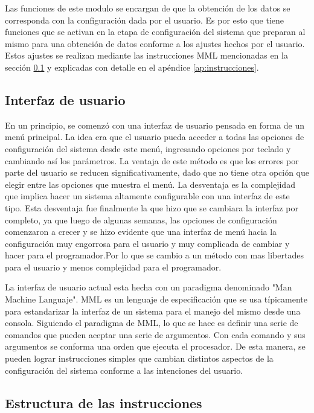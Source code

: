 Las funciones de este modulo se encargan de que la obtenci\'on de los datos se corresponda con la configuraci\'on dada por el usuario. Es por esto que tiene funciones que se activan en la etapa de configuraci\'on del sistema que preparan al mismo para una obtenci\'on de datos conforme a los ajustes hechos por el usuario. Estos ajustes se realizan mediante las instrucciones MML mencionadas en la secci\'on \ref{sub:interfaz_de_usuario} y explicadas con detalle en el ap\'endice \ref{ap:instrucciones}.


\subsection{Interfaz de usuario} %
\label{sub:interfaz_de_usuario}


En un principio, se comenz\'o con una interfaz de usuario pensada en forma de un men\'u principal. La idea era que el usuario pueda acceder a todas las opciones de configuraci\'on del sistema desde este men\'u, ingresando opciones por teclado y cambiando as\'i los par\'ametros. La ventaja de este m\'etodo es que los errores por parte del usuario se reducen significativamente, dado que no tiene otra opci\'on que elegir entre las opciones que muestra el men\'u. La desventaja es la complejidad que implica hacer un sistema altamente configurable con una interfaz de este tipo. Esta desventaja fue finalmente la que hizo que se cambiara la interfaz por completo, ya que luego de algunas semanas, las opciones de configuraci\'on comenzaron a crecer y se hizo evidente que una interfaz de men\'u hacia la configuraci\'on muy engorrosa para el usuario y muy complicada de cambiar y hacer para el programador.Por lo que se cambio a un m\'etodo con mas libertades para el usuario y menos complejidad para el programador.

La interfaz de usuario actual esta hecha con un paradigma denominado "Man Machine Languaje". MML es un lenguaje de especificaci\'on que se usa t\'ipicamente para estandarizar la interfaz de un sistema para el manejo del mismo desde una consola. Siguiendo el paradigma de MML, lo que se hace es definir una serie de comandos que pueden aceptar una serie de argumentos. Con cada comando y sus argumentos se conforma una orden que ejecuta el procesador. De esta manera, se pueden lograr instrucciones simples que cambian distintos aspectos de la configuraci\'on del sistema conforme a las intenciones del usuario.

\subsection{Estructura de las instrucciones}


